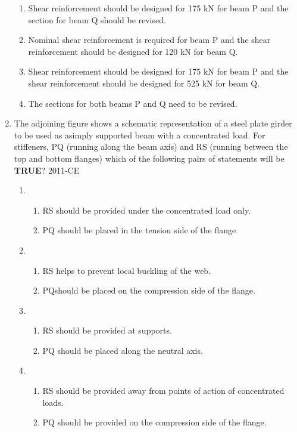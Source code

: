 \documentclass[journal,12pt,onecolumn]{IEEEtran}
\theoremstyle{remark}
\begin{document}
\begin{enumerate}
	\begin{enumerate}
		\item Shear reinforcement should be designed for 175 kN for beam P and the section for beam Q should be revised.
		\item Nominal shear reinforcement is required for beam P and the shear reinforcement should be designed for 120 kN for beam Q.
		\item Shear reinforcement should be designed for 175 kN for beam P and the shear reinforcement should be designed for 525 kN for beam Q.
		\item The sections for both beams P and Q need to be revised.
	\end{enumerate}



\item The adjoining figure shows a schematic representation of a steel plate girder to be used as asimply supported beam with a concentrated load. For stiffeners, PQ (running along the beam axis) and RS (running between the top and bottom flanges) which of the following pairs of statements will be \textbf{TRUE}?
	\hfill{2011-CE}

\begin{figure}[ht]
\centering

\end{figure}
	\begin{enumerate}
		\item \begin{enumerate}
				\item RS should be provided under the concentrated load only.
				\item PQ should be placed in the tension side of the flange
			\end{enumerate}
		\item \begin{enumerate}
				\item RS helps to prevent local buckling of the web.
				\item PQshould be placed on the compression side of the flange.
			\end{enumerate}
		\item \begin{enumerate}
				\item RS should be provided at supports.
				\item PQ should be placed along the neutral axis.
			\end{enumerate}
		\item \begin{enumerate}
				\item RS should be provided away from points of action of concentrated loads.
				\item PQ should be provided on the compression side of the flange.
			\end{enumerate}
	\end{enumerate}


\end{enumerate}
\end{document}
